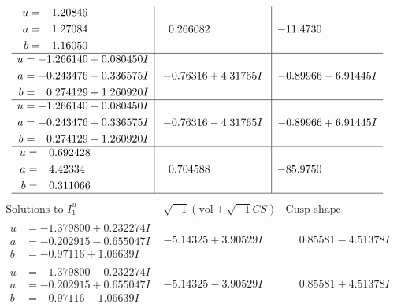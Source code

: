 \documentclass[1p]{elsarticle_modified}
\theoremstyle{definition}
\newcommand{\I}{\sqrt{-1}}
\begin{document}
$$\begin{array}{c|c|c}
\begin{aligned}
u &= \phantom{-}1.20846\phantom{ +0.000000I} \\
a &= \phantom{-}1.27084\phantom{ +0.000000I} \\
b &= \phantom{-}1.16050\phantom{ +0.000000I}\end{aligned}
 & \phantom{-}0.266082\phantom{ +0.000000I} & -11.4730\phantom{ +0.000000I} \\ \hline\begin{aligned}
u &= -1.266140 + 0.080450 I \\
a &= -0.243476 - 0.336575 I \\
b &= \phantom{-}0.274129 + 1.260920 I\end{aligned}
 & -0.76316 + 4.31765 I & -0.89966 - 6.91445 I \\ \hline\begin{aligned}
u &= -1.266140 - 0.080450 I \\
a &= -0.243476 + 0.336575 I \\
b &= \phantom{-}0.274129 - 1.260920 I\end{aligned}
 & -0.76316 - 4.31765 I & -0.89966 + 6.91445 I \\ \hline\begin{aligned}
u &= \phantom{-}0.692428\phantom{ +0.000000I} \\
a &= \phantom{-}4.42334\phantom{ +0.000000I} \\
b &= \phantom{-}0.311066\phantom{ +0.000000I}\end{aligned}
 & \phantom{-}0.704588\phantom{ +0.000000I} & -85.9750\phantom{ +0.000000I}\\
 \hline 
 \end{array}$$\newpage$$\begin{array}{c|c|c}  
\text{Solutions to }I^u_{1}& \I (\text{vol} + \sqrt{-1}CS) & \text{Cusp shape}\\
 \hline 
\begin{aligned}
u &= -1.379800 + 0.232274 I \\
a &= -0.202915 - 0.655047 I \\
b &= -0.97116 + 1.06639 I\end{aligned}
 & -5.14325 + 3.90529 I & \phantom{-}0.85581 - 4.51378 I \\ \hline\begin{aligned}
u &= -1.379800 - 0.232274 I \\
a &= -0.202915 + 0.655047 I \\
b &= -0.97116 - 1.06639 I\end{aligned}
 & -5.14325 - 3.90529 I & \phantom{-}0.85581 + 4.51378 I \\ \hline\begin{aligned}

\end{aligned}
\end{array}$$
\end{document}
